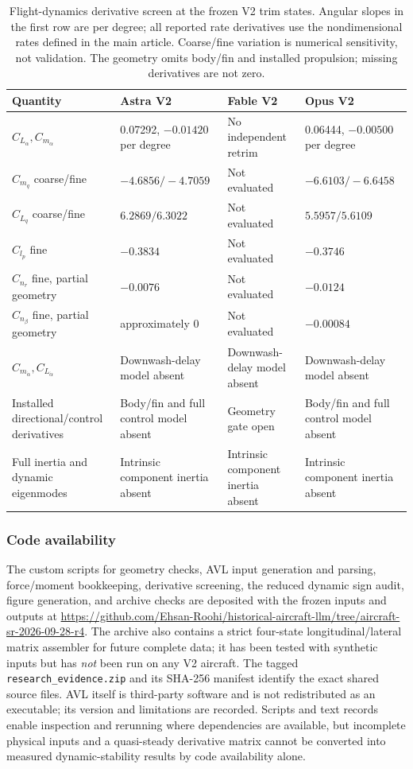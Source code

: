 \documentclass[11pt,a4paper]{article}
\begin{document}
\begin{table}[H]\centering\footnotesize
\caption{Flight-dynamics derivative screen at the frozen V2 trim states. Angular slopes in the first row are per degree; all reported rate derivatives use the nondimensional rates defined in the main article. Coarse/fine variation is numerical sensitivity, not validation. The geometry omits body/fin and installed propulsion; missing derivatives are not zero.}\label{tab:derivativegate}
\begin{tabularx}{\linewidth}{lXXX}\toprule
Quantity & Astra V2 & Fable V2 & Opus V2\\\midrule
$C_{L_\alpha},C_{m_\alpha}$ & 0.07292, $-0.01420$ per degree & No independent retrim & 0.06444, $-0.00500$ per degree\\
$C_{m_q}$ coarse/fine & $-4.6856/-4.7059$ & Not evaluated & $-6.6103/-6.6458$\\
$C_{L_q}$ coarse/fine & $6.2869/6.3022$ & Not evaluated & $5.5957/5.6109$\\
$C_{l_p}$ fine & $-0.3834$ & Not evaluated & $-0.3746$\\
$C_{n_r}$ fine, partial geometry & $-0.0076$ & Not evaluated & $-0.0124$\\
$C_{n_\beta}$ fine, partial geometry & approximately 0 & Not evaluated & $-0.00084$\\
$C_{m_{\dot\alpha}},C_{L_{\dot\alpha}}$ & Downwash-delay model absent & Downwash-delay model absent & Downwash-delay model absent\\
Installed directional/control derivatives & Body/fin and full control model absent & Geometry gate open & Body/fin and full control model absent\\
Full inertia and dynamic eigenmodes & Intrinsic component inertia absent & Intrinsic component inertia absent & Intrinsic component inertia absent\\\bottomrule
\end{tabularx}
\end{table}

\subsubsection{Code availability}
The custom scripts for geometry checks, AVL input generation and parsing, force/moment bookkeeping, derivative screening, the reduced dynamic sign audit, figure generation, and archive checks are deposited with the frozen inputs and outputs at \url{https://github.com/Ehsan-Roohi/historical-aircraft-llm/tree/aircraft-sr-2026-09-28-r4}. The archive also contains a strict four-state longitudinal/lateral matrix assembler for future complete data; it has been tested with synthetic inputs but has \emph{not} been run on any V2 aircraft. The tagged \texttt{research\_evidence.zip} and its SHA-256 manifest identify the exact shared source files. AVL itself is third-party software and is not redistributed as an executable; its version and limitations are recorded. Scripts and text records enable inspection and rerunning where dependencies are available, but incomplete physical inputs and a quasi-steady derivative matrix cannot be converted into measured dynamic-stability results by code availability alone.
\end{document}
